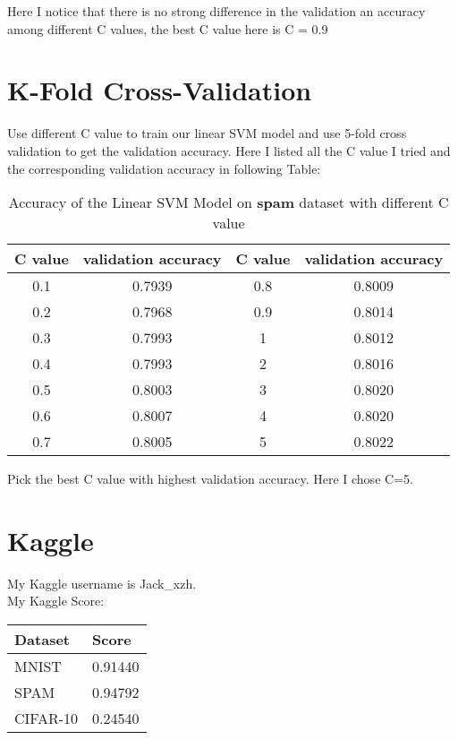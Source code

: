 \documentclass[a4paper,12pt]{article}
\begin{document}
Here I notice that there is no strong difference in the validation an accuracy among different C values, the best C value here is C = 0.9

\clearpage

\section{K-Fold Cross-Validation}
Use different C value to train our linear SVM model and use 5-fold cross validation to get the validation accuracy. Here I listed all the C value I tried and the corresponding validation accuracy in following Table:

\begin{table}[htb]
  \centering
  \caption{Accuracy of the Linear SVM Model on \textbf{spam} dataset with different C value}
    \begin{tabular}{cc|cc}
    \multicolumn{1}{l}{C value} & \multicolumn{1}{l|}{validation accuracy} & \multicolumn{1}{l}{C value} & \multicolumn{1}{l}{validation accuracy}\\
    \hline
    0.1 & 0.7939 &    0.8 & 0.8009 \\
    0.2 & 0.7968 &     0.9 & 0.8014 \\
    0.3 & 0.7993 &     1 & 0.8012 \\
    0.4 & 0.7993 &    2 & 0.8016 \\
    0.5 & 0.8003 &    3 & 0.8020 \\
    0.6 & 0.8007 &    4 & 0.8020 \\
    0.7 & 0.8005 &     5 & 0.8022 \\
    \end{tabular}%
  \label{tab5}%
\end{table}%
 
Pick the best C value with highest validation accuracy. Here I chose C=5.

\clearpage

\section{Kaggle}
My Kaggle username is Jack\_xzh. \\
My Kaggle Score:

\begin{table}[htb]
  \centering
    \begin{tabular}{lr}
    \multicolumn{1}{l}{Dataset} & \multicolumn{1}{l}{Score} \\
    \hline
    MNIST & 0.91440 \\
    SPAM &  0.94792 \\
    CIFAR-10 & 0.24540 \\
    \end{tabular}%
  \label{tab6}%
\end{table}%
\end{document}

